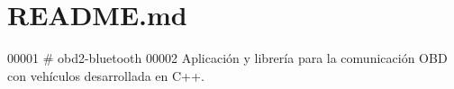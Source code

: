 \hypertarget{README_8md_source}{}\section{R\+E\+A\+D\+M\+E.\+md}

\begin{DoxyCode}
00001 # obd2-bluetooth
00002 Aplicación y librería para la comunicación OBD con vehículos desarrollada en C++.
\end{DoxyCode}
